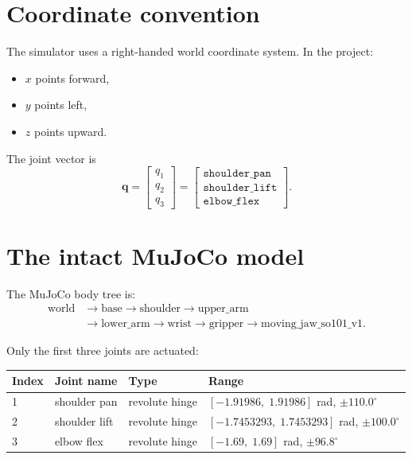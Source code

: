 \documentclass[11pt]{article}
\newcommand{\q}{\mathbf{q}}
\begin{document}
\section{Coordinate convention}
The simulator uses a right-handed world coordinate system. In the project:
\begin{itemize}[leftmargin=1.3em]
  \item \(x\) points forward,
  \item \(y\) points left,
  \item \(z\) points upward.
\end{itemize}

The joint vector is
\[
\q =
\begin{bmatrix}
q_1 \\ q_2 \\ q_3
\end{bmatrix}
=
\begin{bmatrix}
\texttt{shoulder\_pan} \\
\texttt{shoulder\_lift} \\
\texttt{elbow\_flex}
\end{bmatrix}.
\]

\section{The intact MuJoCo model}
The MuJoCo body tree is:
\[
\begin{aligned}
\text{world} &\rightarrow \text{base} \rightarrow \text{shoulder}
\rightarrow \text{upper\_arm} \\
&\rightarrow \text{lower\_arm} \rightarrow \text{wrist}
\rightarrow \text{gripper} \rightarrow \text{moving\_jaw\_so101\_v1}.
\end{aligned}
\]

Only the first three joints are actuated:
\begin{center}
\begin{tabular}{@{}llll@{}}
\toprule
Index & Joint name & Type & Range \\
\midrule
1 & shoulder pan & revolute hinge & \([-1.91986,\;1.91986]\) rad, \(\pm110.0^\circ\) \\
2 & shoulder lift & revolute hinge & \([-1.7453293,\;1.7453293]\) rad, \(\pm100.0^\circ\) \\
3 & elbow flex & revolute hinge & \([-1.69,\;1.69]\) rad, \(\pm96.8^\circ\) \\
\bottomrule
\end{tabular}
\end{center}
\end{document}
